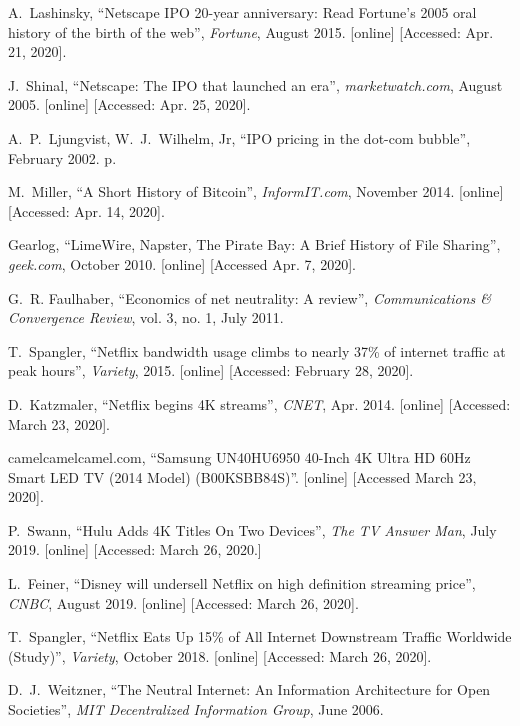 \documentclass[journal]{IEEEtran}
\begin{document}
\begin{thebibliography}{6}
 A.~Lashinsky, \enquote{Netscape IPO 20-year anniversary: Read Fortune’s 2005 oral history of the birth of the web}, \emph{Fortune}, August 2015. [online] [Accessed: Apr. 21, 2020].

 J.~Shinal, \enquote{Netscape: The IPO that launched an era}, \emph{marketwatch.com}, August 2005. [online] [Accessed: Apr. 25, 2020].

 A.~P.~Ljungvist, W.~J.~Wilhelm, Jr, \enquote{IPO pricing in the dot-com bubble}, February 2002. p.

 M.~Miller, \enquote{A Short History of Bitcoin}, \emph{InformIT.com}, November 2014. [online] [Accessed: Apr. 14, 2020].

 Gearlog, \enquote{LimeWire, Napster, The Pirate Bay: A Brief History of File Sharing}, \emph{geek.com}, October 2010. [online] [Accessed Apr. 7, 2020].

 G.~R. Faulhaber, \enquote{Economics of net neutrality: A review}, \emph{Communications \& Convergence Review}, vol. 3, no. 1, July 2011.

 T.~Spangler, \enquote{Netflix bandwidth usage climbs to nearly 37\% of internet traffic at peak hours}, \emph{Variety}, 2015. [online] [Accessed: February 28, 2020].

 D.~Katzmaler, \enquote{Netflix begins 4K streams}, \emph{CNET}, Apr. 2014. [online] [Accessed: March 23, 2020].

 camelcamelcamel.com, \enquote{Samsung UN40HU6950 40-Inch 4K Ultra HD 60Hz Smart LED TV (2014 Model) (B00KSBB84S)}. [online] [Accessed March 23, 2020].

 P.~Swann, \enquote{Hulu Adds 4K Titles On Two Devices},  \emph{The TV Answer Man}, July 2019. [online] [Accessed: March 26, 2020.]

 L.~Feiner, \enquote{Disney will undersell Netflix on high definition streaming price}, \emph{CNBC}, August 2019. [online] [Accessed: March 26, 2020].

 T.~Spangler, \enquote{Netflix Eats Up 15\% of All Internet Downstream Traffic Worldwide (Study)}, \emph{Variety}, October 2018. [online] [Accessed: March 26, 2020].

 D.~J.~Weitzner, \enquote{The Neutral Internet: An Information Architecture for Open Societies}, \emph{MIT Decentralized Information Group},  June 2006.


\end{thebibliography}
\end{document}
